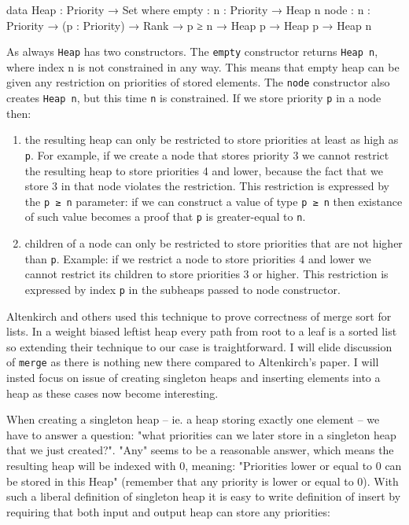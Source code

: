 \begin{code}
data Heap : Priority → Set where
  empty : {n : Priority} → Heap n
  node  : {n : Priority} → (p : Priority) → Rank → p ≥ n →
          Heap p → Heap p → Heap n
\end{code}
\noindent
As always \texttt{Heap} has two constructors. The \texttt{empty} constructor returns \texttt{Heap n}, where index n is not constrained in any way. This means that empty heap can be given any restriction on priorities of stored elements. The \texttt{node} constructor also creates \texttt{Heap n}, but this time \texttt{n} is constrained. If we store priority \texttt{p} in a node then:

\begin{enumerate}
 \item the resulting heap can only be restricted to store priorities at least as high as \texttt{p}. For example, if we create a node that stores priority 3 we cannot restrict the resulting heap to store priorities 4 and lower, because the fact that we store 3 in that node violates the restriction. This restriction is expressed by the \texttt{p ≥ n} parameter: if we can construct a value of type \texttt{p ≥ n} then existance of such value becomes a proof that \texttt{p} is greater-equal to \texttt{n}.
 \item children of a node can only be restricted to store priorities that are not higher than \texttt{p}. Example: if we restrict a node to store priorities 4 and lower we cannot restrict its children to store priorities 3 or higher. This restriction is expressed by index \texttt{p} in the subheaps passed to node constructor.
\end{enumerate}

Altenkirch and others used this technique to prove correctness of merge sort for lists. In a weight biased leftist heap every path from root to a leaf is a sorted list so extending their technique to our case is traightforward. I will elide discussion of \texttt{merge} as there is nothing new there compared to Altenkirch's paper. I will insted focus on issue of creating singleton heaps and inserting elements into a heap as these cases now become interesting.

When creating a singleton heap -- ie. a heap storing exactly one element -- we have to answer a question: "what priorities can we later store in a singleton heap that we just created?". "Any" seems to be a reasonable answer, which means the resulting heap will be indexed with 0, meaning: "Priorities lower or equal to 0 can be stored in this Heap" (remember that any priority is lower or equal to 0). With such a liberal definition of singleton heap it is easy to write definition of insert by requiring that both input and output heap can store any priorities:

